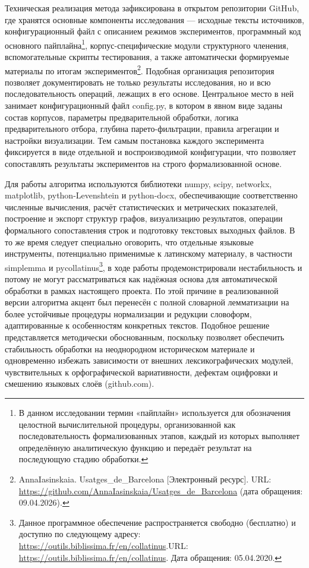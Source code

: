 Техническая реализация метода зафиксирована в открытом репозитории GitHub, где хранятся основные компоненты исследования --- исходные тексты источников, конфигурационный файл с описанием режимов экспериментов, программный код основного пайплайна\footnote{В данном исследовании термин «пайплайн» используется для обозначения целостной вычислительной процедуры, организованной как последовательность формализованных этапов, каждый из которых выполняет определённую аналитическую функцию и передаёт результат на последующую стадию обработки.}, корпус-специфические модули структурного членения, вспомогательные скрипты тестирования, а также автоматически формируемые материалы по итогам экспериментов\footnote{AnnaIasinskaia. Usatges\_de\_Barcelona [Электронный ресурс]. URL: \url{https://github.com/AnnaIasinskaia/Usatges\_de\_Barcelona} (дата обращения: 09.04.2026).}. Подобная организация репозитория позволяет документировать не только результаты исследования, но и всю последовательность операций, лежащих в его основе. Центральное место в ней занимает конфигурационный файл config.py, в котором в явном виде заданы состав корпусов, параметры предварительной обработки, логика предварительного отбора, глубина парето-фильтрации, правила агрегации и настройки визуализации. Тем самым постановка каждого эксперимента фиксируется в виде отдельной и воспроизводимой конфигурации, что позволяет сопоставлять результаты экспериментов на строго формализованной основе.

Для работы алгоритма используются библиотеки numpy, scipy, networkx, matplotlib, python-Levenshtein и python-docx, обеспечивающие соответственно численные вычисления, расчёт статистических и метрических показателей, построение и экспорт структур графов, визуализацию результатов, операции формального сопоставления строк и подготовку текстовых выходных файлов. В то же время следует специально оговорить, что отдельные языковые инструменты, потенциально применимые к латинскому материалу, в частности simplemma и pycollatinus\footnote{Данное программное обеспечение распространяется свободно (бесплатно) и доступно по следующему адресу: \url{https://outils.biblissima.fr/en/collatinus}.URL: \url{https://outils.biblissima.fr/en/collatinus}. Дата обращения: 05.04.2020.}, в ходе работы продемонстрировали нестабильность и потому не могут рассматриваться как надёжная основа для автоматической обработки в рамках настоящего проекта. По этой причине в реализованной версии алгоритма акцент был перенесён с полной словарной лемматизации на более устойчивые процедуры нормализации и редукции словоформ, адаптированные к особенностям конкретных текстов. Подобное решение представляется методически обоснованным, поскольку позволяет обеспечить стабильность обработки на неоднородном историческом материале и одновременно избежать зависимости от внешних лексикографических модулей, чувствительных к орфографической вариативности, дефектам оцифровки и смешению языковых слоёв (github.com).

